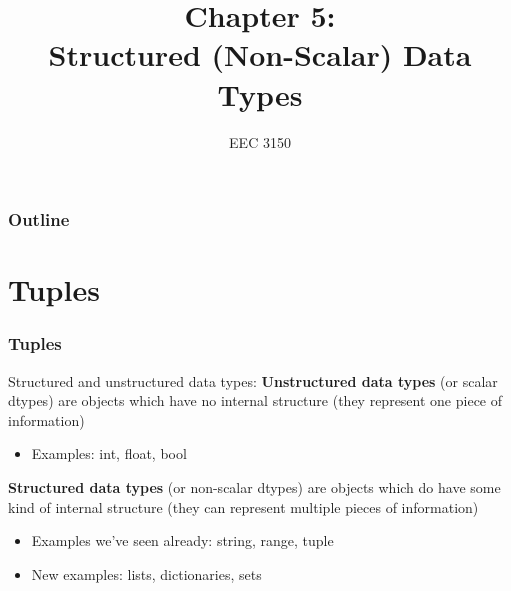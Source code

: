 \documentclass{beamer}
\title{Chapter 5: \\ Structured (Non-Scalar) Data Types}
\author{EEC 3150}
\date{}
\institute{Trevecca Nazarene University}
\begin{document}
\frame{\titlepage}
 
\begin{frame}	
	\frametitle{Outline}
	\tableofcontents	
\end{frame}


\section{Tuples}

\begin{frame}	
\end{frame}

\begin{frame}	
	\frametitle{Tuples}
	
	\begin{alertblock}{Structured and unstructured data types:}
		\textbf{Unstructured data types} (or scalar dtypes) are objects which have no internal structure (they represent one piece of information)
		\begin{itemize}
			\item Examples: int, float, bool
		\end{itemize}
		\textbf{Structured data types} (or non-scalar dtypes) are objects which do have some kind of internal structure (they can represent multiple pieces of information)
		\begin{itemize}
			\item Examples we've seen already: string, range, tuple
			\item New examples: lists, dictionaries, sets
		\end{itemize}
	\end{alertblock}
	
\end{frame}
\end{document}
